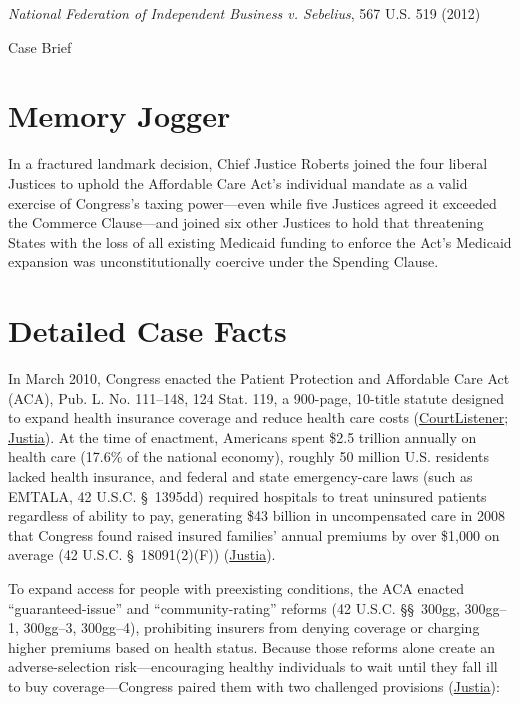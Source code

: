 \documentclass[12pt]{article}
\begin{document}
\begin{center}
{\LARGE \textit{National Federation of Independent Business v. Sebelius}, 567 U.S. 519 (2012)\par}
\vspace{0.8em}
{\large Case Brief\par}
\end{center}
\vspace{1em}

\section{Memory Jogger}
In a fractured landmark decision, Chief Justice Roberts joined the four liberal Justices to uphold the Affordable Care Act's individual mandate as a valid exercise of Congress's taxing power---even while five Justices agreed it exceeded the Commerce Clause---and joined six other Justices to hold that threatening States with the loss of all existing Medicaid funding to enforce the Act's Medicaid expansion was unconstitutionally coercive under the Spending Clause.

\section{Detailed Case Facts}
In March 2010, Congress enacted the Patient Protection and Affordable Care Act (ACA), Pub. L. No. 111--148, 124 Stat. 119, a 900-page, 10-title statute designed to expand health insurance coverage and reduce health care costs (\href{https://www.courtlistener.com/opinion/809122/national-federation-of-independent-business-v-sebelius/}{CourtListener}; \href{https://supreme.justia.com/cases/federal/us/567/519/}{Justia}). At the time of enactment, Americans spent \$2.5 trillion annually on health care (17.6\% of the national economy), roughly 50 million U.S. residents lacked health insurance, and federal and state emergency-care laws (such as EMTALA, 42 U.S.C. \S~1395dd) required hospitals to treat uninsured patients regardless of ability to pay, generating \$43 billion in uncompensated care in 2008 that Congress found raised insured families' annual premiums by over \$1,000 on average (42 U.S.C. \S~18091(2)(F)) (\href{https://supreme.justia.com/cases/federal/us/567/519/}{Justia}).

To expand access for people with preexisting conditions, the ACA enacted ``guaranteed-issue'' and ``community-rating'' reforms (42 U.S.C. \S\S~300gg, 300gg--1, 300gg--3, 300gg--4), prohibiting insurers from denying coverage or charging higher premiums based on health status. Because those reforms alone create an adverse-selection risk---encouraging healthy individuals to wait until they fall ill to buy coverage---Congress paired them with two challenged provisions (\href{https://supreme.justia.com/cases/federal/us/567/519/}{Justia}):
\end{document}
